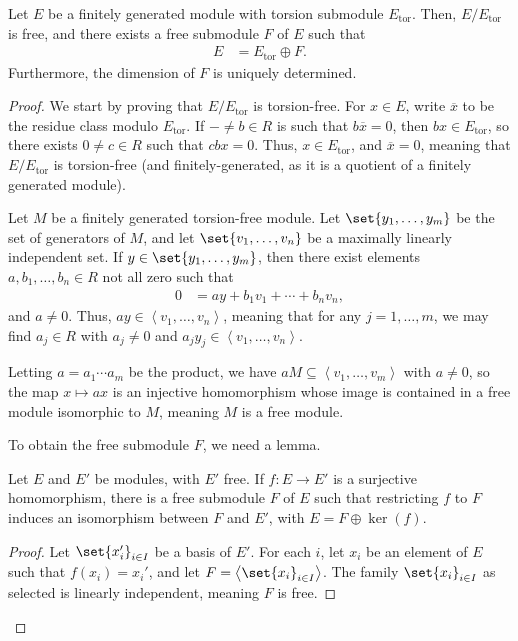 \documentclass[10pt]{mypackage}
\DeclareMathOperator{\tor}{tor}
\begin{document}
\begin{theorem}
  Let $E$ be a finitely generated module with torsion submodule $E_{\tor}$. Then, $E/E_{\tor}$ is free, and there exists a free submodule $F$ of $E$ such that
  \begin{align*}
    E &= E_{\tor}\oplus F.
  \end{align*}
  Furthermore, the dimension of $F$ is uniquely determined.
\end{theorem}
\begin{proof}
  We start by proving that $E/E_{\tor}$ is torsion-free. For $x\in E$, write $\overline{x}$ to be the residue class modulo $E_{\tor}$. If $-\neq b\in R$ is such that $b\overline{x} = 0$, then $bx \in E_{\tor}$, so there exists $0\neq c\in R$ such that $cbx = 0$. Thus, $x\in E_{\tor}$, and $\overline{x} = 0$, meaning that $E/E_{\tor}$ is torsion-free (and finitely-generated, as it is a quotient of a finitely generated module).\newline

  Let $M$ be a finitely generated torsion-free module. Let $\set{y_1,\dots,y_m}$ be the set of generators of $M$, and let $\set{v_1,\dots,v_n}$ be a maximally linearly independent set. If $y\in \set{y_1,\dots,y_m}$, then there exist elements $a,b_1,\dots,b_n\in R$ not all zero such that
  \begin{align*}
    0 &= ay + b_1v_1 + \cdots + b_nv_n,
  \end{align*}
  and $a\neq 0$. Thus, $ay\in \left\langle v_1,\dots,v_n \right\rangle$, meaning that for any $j = 1,\dots,m$, we may find $a_j\in R$ with $a_j\neq 0$ and $a_jy_j\in \left\langle v_1,\dots,v_n \right\rangle$.\newline

  Letting $a = a_1\cdots a_m$ be the product, we have $aM \subseteq \left\langle v_1,\dots,v_m \right\rangle$ with $a\neq 0$, so the map $x\mapsto ax$ is an injective homomorphism whose image is contained in a free module isomorphic to $M$, meaning $M$ is a free module.\newline

  To obtain the free submodule $F$, we need a lemma.
  \begin{lemma}
    Let $E$ and $E'$ be modules, with $E'$ free. If $f\colon E\rightarrow E'$ is a surjective homomorphism, there is a free submodule $F$ of $E$ such that restricting $f$ to $F$ induces an isomorphism between $F$ and $E'$, with $E = F \oplus \ker\left( f \right)$.
  \end{lemma}
  \begin{proof}
    Let $\set{x_i'}_{i\in I}$ be a basis of $E'$. For each $i$, let $x_i$ be an element of $E$ such that $f\left( x_i \right) = x_i'$, and let $F = \left\langle \set{x_i}_{i\in I} \right\rangle$. The family $\set{x_i}_{i\in I}$ as selected is linearly independent, meaning $F$ is free.\newline


\end{proof}
\end{proof}
\end{document}
